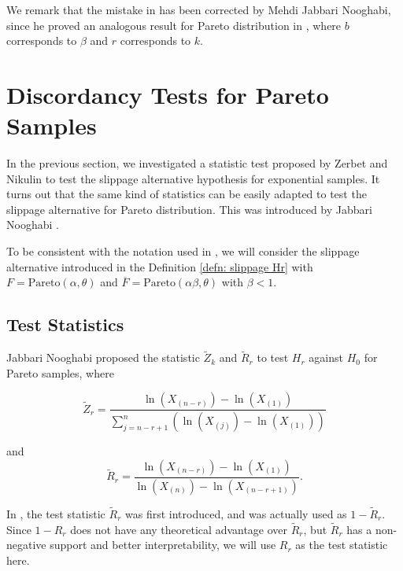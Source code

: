 \documentclass{report}
\begin{document}
\begin{rem}
    We remark that the mistake in \cite{zerbet2003new} has been corrected by Mehdi Jabbari Nooghabi,
    since he proved an analogous result for Pareto distribution in \cite{jabbari2019detecting}, where $b$  corresponds to $\beta$ and $r$
    corresponds to $k$.
\end{rem}  


\section{Discordancy Tests for Pareto Samples}

In the previous section, we investigated a statistic test proposed by
Zerbet and Nikulin to test the slippage alternative hypothesis for exponential samples. It turns out
that the same kind of statistics can be easily adapted to test the slippage alternative for Pareto distribution.
This was introduced by Jabbari Nooghabi \cite{jabbari2019detecting}.

To be consistent with the notation used in \cite{jabbari2019detecting}, we will consider the slippage alternative introduced
in the Definition \ref{defn: slippage Hr} with $F = \mathrm{Pareto}(\alpha, \theta)$ and $\overline F = \mathrm{Pareto}(\alpha \beta, \theta)$ with $\beta <1$.

\subsection{Test Statistics}

Jabbari Nooghabi \cite{jabbari2019detecting} proposed the statistic $\tilde Z_k$ and $\tilde R_r$ to test $H_r$ against $H_0$ for Pareto samples, where

\[ 
    \tilde Z_r = \frac{\ln(X_{(n-r)}) - \ln(X_{(1)})}{\sum_{j = n - r + 1}^n (\ln(X_{(j)}) - \ln(X_{(1)}))}
\]
    
    and
\[
       \tilde R_r = \frac{\ln(X_{(n-r)}) - \ln(X_{(1)})}{\ln(X_{(n)}) - \ln(X_{(n-r+1)})}.
\]
        
In \cite{jabbari2019detecting}, the test statistic $\tilde R_r$ was first introduced, and was actually used as $1 - \tilde R_r$.  Since $1 - R_r$ does not
have any theoretical advantage over $\tilde R_r$, but $\tilde R_r$ has a non-negative support and better interpretability, we will use $R_r$ as
the test statistic here.


\end{document}
